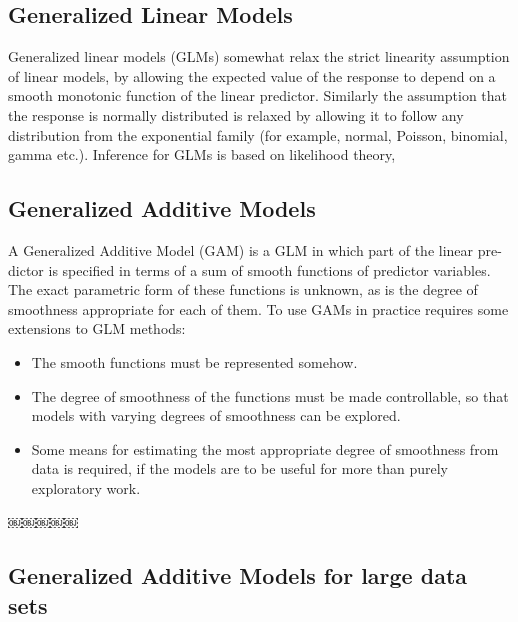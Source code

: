 \documentclass{article}
\begin{document}
    \subsection{Generalized Linear Models}
    Generalized linear models (GLMs) somewhat relax the strict linearity assumption of linear models, by allowing the expected value of the response to depend on a smooth monotonic function of the linear predictor. Similarly the assumption that the response is normally distributed is relaxed by allowing it to follow any distribution from the exponential family (for example, normal, Poisson, binomial, gamma etc.). Inference for GLMs is based on likelihood theory,

    \subsection{Generalized Additive Models}
    A Generalized Additive Model (GAM) is a GLM in which part of the linear pre- dictor is specified in terms of a sum of smooth functions of predictor variables. The exact parametric form of these functions is unknown, as is the degree of smoothness appropriate for each of them. To use GAMs in practice requires some extensions to GLM methods:
    \begin{itemize}
        \item The smooth functions must be represented somehow.
        \item The degree of smoothness of the functions must be made controllable, so that models with varying degrees of smoothness can be explored.
        \item Some means for estimating the most appropriate degree of smoothness from data is required, if the models are to be useful for more than purely exploratory work.
    \end{itemize}
￼￼￼￼￼

    \subsection{Generalized Additive Models for large data sets}
    \cite{McDonell2013Optimising}
\end{document}
